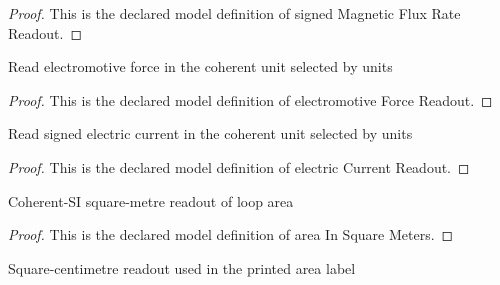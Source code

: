 \begin{proof}
  This is the declared model definition of signed Magnetic Flux Rate Readout.
\end{proof}
\begin{definition}
  \label{def:physics:phyx-mini-0917:phyxminiproblems-problemphyxmini0917-electromotiveforcereadout}
  Read electromotive force in the coherent unit selected by units
\end{definition}
\begin{proof}
  This is the declared model definition of electromotive Force Readout.
\end{proof}
\begin{definition}
  \label{def:physics:phyx-mini-0917:phyxminiproblems-problemphyxmini0917-electriccurrentreadout}
  Read signed electric current in the coherent unit selected by units
\end{definition}
\begin{proof}
  This is the declared model definition of electric Current Readout.
\end{proof}
\begin{definition}
  \label{def:physics:phyx-mini-0917:phyxminiproblems-problemphyxmini0917-areainsquaremeters}
  Coherent-SI square-metre readout of loop area
\end{definition}
\begin{proof}
  This is the declared model definition of area In Square Meters.
\end{proof}
\begin{definition}
  \label{def:physics:phyx-mini-0917:phyxminiproblems-problemphyxmini0917-areainsquarecentimeters}
  Square-centimetre readout used in the printed area label
\end{definition}
